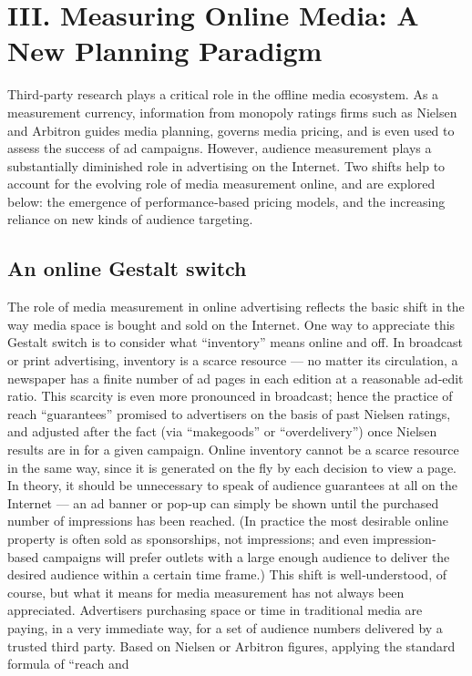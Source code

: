 \chapter{III. Measuring Online Media: A New Planning Paradigm}
Third‐party research plays a critical role in the offline media ecosystem.
As a measurement currency, information from monopoly ratings firms
such as Nielsen and Arbitron guides media planning, governs media
pricing, and is even used to assess the success of ad campaigns. However,
audience measurement plays a substantially diminished role in
advertising on the Internet. Two shifts help to account for the evolving
role of media measurement online, and are explored below: the
emergence of performance‐based pricing models, and the increasing
reliance on new kinds of audience targeting.
\section{An online Gestalt switch}
The role of media measurement in online advertising reflects the basic
shift in the way media space is bought and sold on the Internet. One way
to appreciate this Gestalt switch is to consider what ``inventory'' means
online and off. In broadcast or print advertising, inventory is a scarce
resource — no matter its circulation, a newspaper has a finite number of
ad pages in each edition at a reasonable ad‐edit ratio. This scarcity is even
more pronounced in broadcast; hence the practice of reach ``guarantees''
promised to advertisers on the basis of past Nielsen ratings, and adjusted
after the fact (via ``makegoods'' or ``overdelivery'') once Nielsen results are
in for a given campaign.
Online inventory cannot be a scarce resource in the same way, since it is
generated on the fly by each decision to view a page. In theory, it should
be unnecessary to speak of audience guarantees at all on the Internet — an
ad banner or pop‐up can simply be shown until the purchased number of
impressions has been reached. (In practice the most desirable online
property is often sold as sponsorships, not impressions; and even
impression‐based campaigns will prefer outlets with a large enough
audience to deliver the desired audience within a certain time frame.)
This shift is well‐understood, of course, but what it means for media
measurement has not always been appreciated. Advertisers purchasing
space or time in traditional media are paying, in a very immediate way,
for a set of audience numbers delivered by a trusted third party. Based on
Nielsen or Arbitron figures, applying the standard formula of ``reach and
